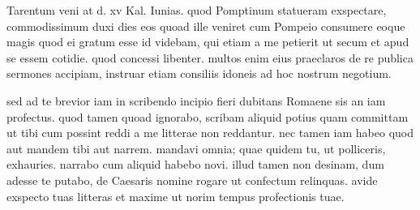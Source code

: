 


 Tarentum veni at d. xv Kal. Iunias. quod Pomptinum statueram exspectare, commodissimum duxi dies eos quoad ille veniret cum Pompeio consumere eoque magis quod ei gratum esse id videbam, qui etiam a me petierit ut secum et apud se essem cotidie. quod concessi libenter. multos enim eius praeclaros de re publica sermones accipiam, instruar etiam consiliis idoneis ad hoc nostrum negotium.

 sed ad te brevior iam in scribendo incipio fieri dubitans Romaene sis an iam profectus. quod tamen quoad ignorabo, scribam aliquid potius quam committam ut tibi cum possint reddi a me litterae non reddantur. nec tamen iam habeo quod aut mandem tibi aut narrem. mandavi omnia; quae quidem tu, ut polliceris, exhauries. narrabo cum aliquid habebo novi. illud tamen non desinam, dum adesse te putabo, de Caesaris nomine rogare ut confectum relinquas. avide exspecto tuas litteras et maxime ut norim tempus profectionis tuae.
